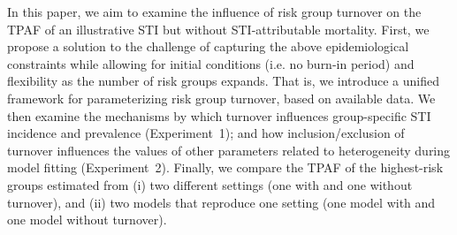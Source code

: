 \par
In this paper, we aim to examine the influence of risk group turnover 
on the TPAF of an illustrative STI but without STI-attributable mortality. First, 	%
we propose a solution to the challenge of capturing the above
epidemiological constraints while allowing for initial conditions (i.e. no burn-in period)
and flexibility as the number of risk groups expands. That is, we
introduce a unified framework for
parameterizing risk group turnover, based on available data.
We then examine the mechanisms by which turnover 
influences group-specific STI incidence and prevalence
(Experiment~1); and how inclusion/exclusion of turnover influences
the values of other parameters related to heterogeneity during model fitting
(Experiment~2). Finally, we compare the TPAF of the highest-risk groups 
estimated from (i) two different settings (one with and one without turnover), 
and (ii) two models that reproduce one setting (one model with and one model without turnover).